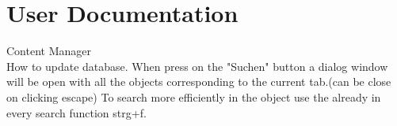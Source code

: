 \section{User Documentation}
Content Manager\\
How to update database.
When press on the "Suchen" button a dialog window will be open with all the objects corresponding to the current tab.(can be close on clicking escape)
To search more efficiently in the object use the already in every search function strg+f.\\\\





